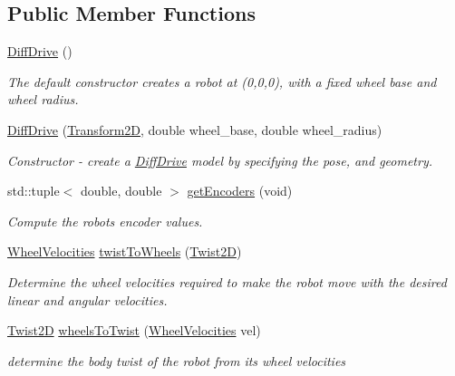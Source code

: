 \subsection*{Public Member Functions}
\begin{DoxyCompactItemize}
\item 
\mbox{\label{classrigid2d_1_1DiffDrive_a2d646290b7a03d391a59e8a296fea30d}} 
\hyperlink{classrigid2d_1_1DiffDrive_a2d646290b7a03d391a59e8a296fea30d}{Diff\+Drive} ()
\begin{DoxyCompactList}\small\item\em The default constructor creates a robot at (0,0,0), with a fixed wheel base and wheel radius. \end{DoxyCompactList}\item 
\hyperlink{classrigid2d_1_1DiffDrive_a40b4756591df4548335371fea7bf60b4}{Diff\+Drive} (\hyperlink{classrigid2d_1_1Transform2D}{Transform2D}, double wheel\+\_\+base, double wheel\+\_\+radius)
\begin{DoxyCompactList}\small\item\em Constructor -\/ create a \hyperlink{classrigid2d_1_1DiffDrive}{Diff\+Drive} model by specifying the pose, and geometry. \end{DoxyCompactList}\item 
std\+::tuple$<$ double, double $>$ \hyperlink{classrigid2d_1_1DiffDrive_a9f8e57efccb3ea515c844e25828a373e}{get\+Encoders} (void)
\begin{DoxyCompactList}\small\item\em Compute the robot\textquotesingle{}s encoder values. \end{DoxyCompactList}\item 
\hyperlink{structrigid2d_1_1WheelVelocities}{Wheel\+Velocities} \hyperlink{classrigid2d_1_1DiffDrive_a62e097a7ce1162a9731f184679002573}{twist\+To\+Wheels} (\hyperlink{classrigid2d_1_1Twist2D}{Twist2D})
\begin{DoxyCompactList}\small\item\em Determine the wheel velocities required to make the robot move with the desired linear and angular velocities. \end{DoxyCompactList}\item 
\hyperlink{classrigid2d_1_1Twist2D}{Twist2D} \hyperlink{classrigid2d_1_1DiffDrive_a726f6bc97c6431bd80164e0403f36c2b}{wheels\+To\+Twist} (\hyperlink{structrigid2d_1_1WheelVelocities}{Wheel\+Velocities} vel)
\begin{DoxyCompactList}\small\item\em determine the body twist of the robot from its wheel velocities \end{DoxyCompactList}\item 

\end{DoxyCompactItemize}
